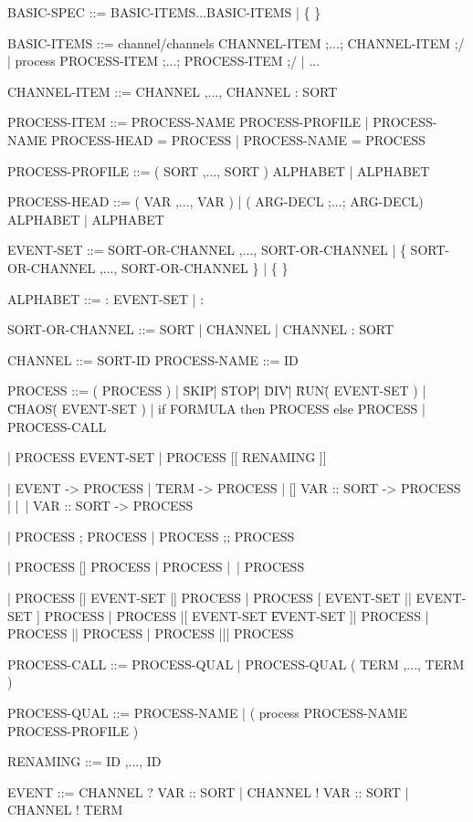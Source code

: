 BASIC-SPEC      ::= BASIC-ITEMS...BASIC-ITEMS  |  \{ \}

BASIC-ITEMS     ::= channel/channels CHANNEL-ITEM ;...; CHANNEL-ITEM ;/
                  | process PROCESS-ITEM ;...; PROCESS-ITEM ;/
                  | ...

CHANNEL-ITEM    ::= CHANNEL ,..., CHANNEL : SORT

PROCESS-ITEM    ::= PROCESS-NAME PROCESS-PROFILE    %
                  | PROCESS-NAME PROCESS-HEAD = PROCESS
                  | PROCESS-NAME = PROCESS

PROCESS-PROFILE ::= ( SORT ,..., SORT ) ALPHABET
                  | ALPHABET

PROCESS-HEAD    ::= ( VAR ,..., VAR )              %
                  | ( ARG-DECL ;...; ARG-DECL) ALPHABET
                  | ALPHABET

EVENT-SET       ::= SORT-OR-CHANNEL ,..., SORT-OR-CHANNEL
                  | \{ SORT-OR-CHANNEL ,..., SORT-OR-CHANNEL \}
                  | \{ \}   %

ALPHABET        ::= : EVENT-SET
                  | :       %

SORT-OR-CHANNEL ::= SORT
                  | CHANNEL
                  | CHANNEL : SORT

CHANNEL         ::= SORT-ID
PROCESS-NAME    ::= ID

PROCESS   ::= ( PROCESS )                   %
            | \"SKIP\"
            | \"STOP\"
            | \"DIV\"
            | \"RUN\" ( EVENT-SET )
            | \"CHAOS\" ( EVENT-SET )
            | if FORMULA then PROCESS else PROCESS
            | PROCESS-CALL

            | PROCESS \back EVENT-SET       %
            | PROCESS [[ RENAMING ]]

            | EVENT -> PROCESS
            | TERM -> PROCESS
            | [] VAR :: SORT -> PROCESS     %
            | |~| VAR :: SORT -> PROCESS

            | PROCESS ; PROCESS
            | PROCESS ;; PROCESS %

            | PROCESS [] PROCESS            %
            | PROCESS |~| PROCESS

            | PROCESS [| EVENT-SET |] PROCESS             %
            | PROCESS [ EVENT-SET || EVENT-SET ] PROCESS  %
            | PROCESS |[ EVENT-SET \| EVENT-SET ]| PROCESS %
            | PROCESS || PROCESS                          %
            | PROCESS ||| PROCESS                         %

PROCESS-CALL    ::= PROCESS-QUAL
                  | PROCESS-QUAL ( TERM ,..., TERM )

PROCESS-QUAL    ::= PROCESS-NAME
                  | ( process PROCESS-NAME PROCESS-PROFILE )

RENAMING        ::= ID ,..., ID       %

EVENT           ::= CHANNEL ? VAR :: SORT
                  | CHANNEL ! VAR :: SORT
                  | CHANNEL ! TERM

